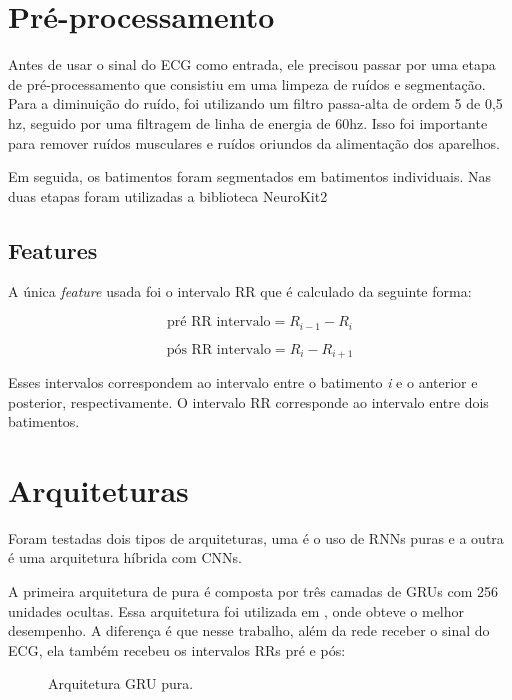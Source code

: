 \section{Pré-processamento}
\label{sec:pre_process}

Antes de usar o sinal do ECG como entrada, ele precisou passar por uma etapa de pré-processamento que consistiu em uma limpeza de ruídos e segmentação.
Para a diminuição do ruído, foi utilizando um filtro passa-alta de ordem 5 de 0,5 hz, seguido por uma filtragem de linha de energia de 60hz. 
Isso foi importante para remover ruídos musculares e ruídos oriundos da alimentação dos aparelhos. 

Em seguida, os batimentos foram segmentados em batimentos individuais. Nas duas etapas foram utilizadas a biblioteca NeuroKit2 \cite{Makowski2021neurokit}

\subsection{Features}

A única \textit{feature} usada foi o intervalo RR que é calculado da seguinte forma: 

\begin{equation}
\text{pré RR intervalo} = R_{i-1} - R_{i}
\end{equation}

\begin{equation}
\text{pós RR intervalo} = R_{i} - R_{i+1}
\end{equation}

Esses intervalos correspondem ao intervalo entre o batimento \textit{i} e o anterior e posterior, respectivamente. O intervalo RR corresponde ao intervalo 
entre dois batimentos.

\section{Arquiteturas}
\label{sec:modelos}

Foram testadas dois tipos de arquiteturas, uma é o uso de RNNs puras e a outra é uma arquitetura híbrida com CNNs. 

A primeira arquitetura de pura é composta por três camadas de GRUs com 256 unidades ocultas. Essa arquitetura foi utilizada em , onde obteve o melhor desempenho. 
A diferença é que nesse trabalho, além da rede receber o sinal do ECG, ela também recebeu os intervalos RRs pré e pós:


\begin{figure}[H]
  \centering
  \caption{Arquitetura GRU pura.}
  \label{fig:gru_pura}
\end{figure}

